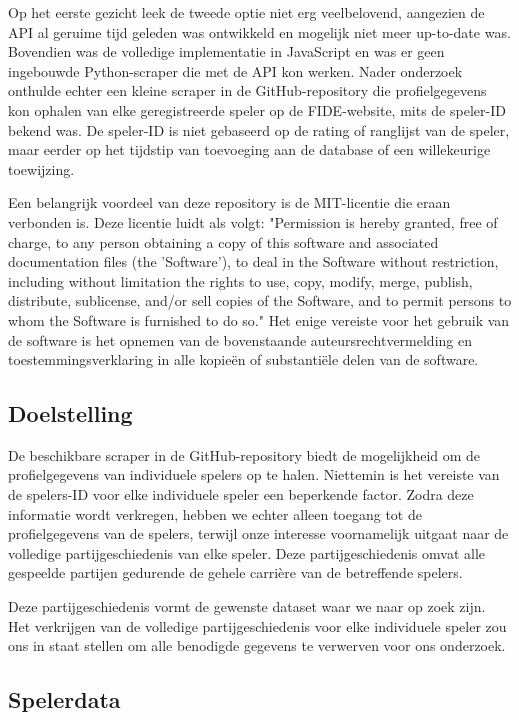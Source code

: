 Op het eerste gezicht leek de tweede optie niet erg veelbelovend, aangezien de API al geruime tijd geleden was ontwikkeld en mogelijk niet meer up-to-date was. Bovendien was de volledige implementatie in JavaScript en was er geen ingebouwde Python-scraper die met de API kon werken. Nader onderzoek onthulde echter een kleine scraper in de GitHub-repository die profielgegevens kon ophalen van elke geregistreerde speler op de FIDE-website, mits de speler-ID bekend was. De speler-ID is niet gebaseerd op de rating of ranglijst van de speler, maar eerder op het tijdstip van toevoeging aan de database of een willekeurige toewijzing.

Een belangrijk voordeel van deze repository is de MIT-licentie die eraan verbonden is. Deze licentie luidt als volgt: "Permission is hereby granted, free of charge, to any person obtaining a copy of this software and associated documentation files (the 'Software'), to deal in the Software without restriction, including without limitation the rights to use, copy, modify, merge, publish, distribute, sublicense, and/or sell copies of the Software, and to permit persons to whom the Software is furnished to do so." Het enige vereiste voor het gebruik van de software is het opnemen van de bovenstaande auteursrechtvermelding en toestemmingsverklaring in alle kopieën of substantiële delen van de software.

\subsection{Doelstelling}

De beschikbare scraper in de GitHub-repository biedt de mogelijkheid om de profielgegevens van individuele spelers op te halen. Niettemin is het vereiste van de spelers-ID voor elke individuele speler een beperkende factor. Zodra deze informatie wordt verkregen, hebben we echter alleen toegang tot de profielgegevens van de spelers, terwijl onze interesse voornamelijk uitgaat naar de volledige partijgeschiedenis van elke speler. Deze partijgeschiedenis omvat alle gespeelde partijen gedurende de gehele carrière van de betreffende spelers.

Deze partijgeschiedenis vormt de gewenste dataset waar we naar op zoek zijn. Het verkrijgen van de volledige partijgeschiedenis voor elke individuele speler zou ons in staat stellen om alle benodigde gegevens te verwerven voor ons onderzoek.

\subsection{Spelerdata}

